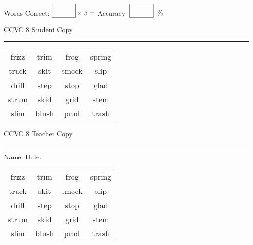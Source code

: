 \documentclass{memoir}
\begin{document}
\small

Words Correct: $\fbox{\phantom{\huge 100}} \times 5 = $ Accuracy: $\fbox{\phantom{\huge 100}}\;\; \%$ 

\vfill

\newpage


\footnotesize \noindent
CCVC 8 \hfill Student Copy
\smallskip
\hrule

\Large

\setlength{\tabcolsep}{14pt}
\def\arraystretch{3}

{\selectfont


\begin{vplace}[0.5]
\begin{center}
\begin{tabular}{cccc}
frizz & trim & frog & spring \\
truck & skit & smock & slip \\
drill & step & stop & glad \\
strum & skid & grid & stem \\
slim & blush & prod & trash \\
\end{tabular}
\end{center}
\end{vplace}

}

\newpage

\footnotesize \noindent
CCVC 8 \hfill Teacher Copy
\smallskip
\hrule

\small

\vfill

\noindent
Name: \underline{\hspace{1.75in}} \hfill Date: \underline{\hspace{1in}}

\Large

{\selectfont


\begin{vplace}[0.5]
\begin{center}
\begin{tabular}{cccc}
frizz & trim & frog & spring \\
truck & skit & smock & slip \\
drill & step & stop & glad \\
strum & skid & grid & stem \\
slim & blush & prod & trash \\
\end{tabular}
\end{center}
\end{vplace}



}
\end{document}
